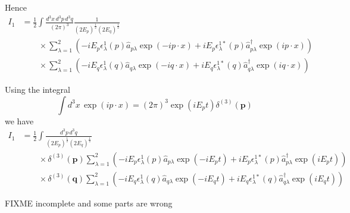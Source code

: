 Hence
\begin{align*}
I_1&=\frac{1}{2}\int
\frac{d^3x\,d^3p\,d^3q}{(2\pi)^3}\frac{1}{(2E_p)^\frac{1}{2}(2E_q)^\frac{1}{2}}
\\
&\qquad
{}\times\sum_{\lambda=1}^2
\left(
-iE_p\epsilon_\lambda^1(p)\hat a_{p\lambda}\exp(-ip\cdot x)
+iE_p\epsilon_\lambda^{1*}(p)\hat a_{p\lambda}^\dag\exp(ip\cdot x)
\right)
\\
&\qquad
{}\times\sum_{\lambda=1}^2
\left(
-iE_q\epsilon_\lambda^1(q)\hat a_{q\lambda}\exp(-iq\cdot x)
+iE_q\epsilon_\lambda^{1*}(q)\hat a_{q\lambda}^\dag\exp(iq\cdot x)
\right)
\end{align*}

Using the integral
\begin{equation*}
\int d^3x\,\exp(ip\cdot x)=(2\pi)^3\exp(iE_pt)\delta^{(3)}(\mathbf p)
\end{equation*}
we have
\begin{align*}
I_1&=\frac{1}{2}\int
\frac{d^3p\,d^3q}{(2E_p)^\frac{1}{2}(2E_q)^\frac{1}{2}}
\\
&\qquad
{}\times
\delta^{(3)}(\mathbf p)
\sum_{\lambda=1}^2
\left(
-iE_p\epsilon_\lambda^1(p)\hat a_{p\lambda}\exp(-iE_pt)
+iE_p\epsilon_\lambda^{1*}(p)\hat a_{p\lambda}^\dag\exp(iE_pt)
\right)
\\
&\qquad
{}\times
\delta^{(3)}(\mathbf q)
\sum_{\lambda=1}^2
\left(
-iE_q\epsilon_\lambda^1(q)\hat a_{q\lambda}\exp(-iE_qt)
+iE_q\epsilon_\lambda^{1*}(q)\hat a_{q\lambda}^\dag\exp(iE_qt)
\right)
\end{align*}

FIXME incomplete and some parts are wrong


